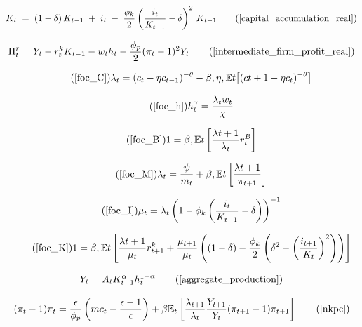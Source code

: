 \documentclass[11pt,preprint]{elsarticle}
\numberwithin{equation}{section}
\numberwithin{figure}{section}
\numberwithin{table}{section}
\begin{document}
\begin{equation}
K_t
\;=\;
(1 - \delta)\,K_{t-1}
\;+\; i_t
\;-\;\frac{\phi_k}{2}
\left(\frac{i_t}{K_{t-1}} - \delta\right)^{2}
\,K_{t-1}
\tag{\ref{capital_accumulation_real}}
\end{equation}

\begin{equation}
\Pi^r_t = Y_t - r^k_t K_{t-1} - w_t h_t - \dfrac{\phi_p}{2} (\pi_t - 1)^2 Y_t
\tag{\ref{intermediate_firm_profit_real}}
\end{equation}

\begin{equation}\tag{\ref{foc_C}}
\lambda_t = (c_t-\eta c_{t-1})^{-\theta} - \beta,\eta,\mathbb{E}t\bigl[(c{t+1}-\eta c_t)^{-\theta}\bigr]
\end{equation}

\begin{equation}\tag{\ref{foc_h}}
h_t^{\gamma} = \frac{\lambda_t w_t}{\chi}
\end{equation}

\begin{equation}\tag{\ref{foc_B}}
1 = \beta , \mathbb{E}t \left[ \frac{\lambda{t+1}}{\lambda_t} r^B_t \right]
\end{equation}

\begin{equation}\tag{\ref{foc_M}}
\lambda_t = \dfrac{\psi}{m_t} + \beta , \mathbb{E}t \left[ \dfrac{\lambda{t+1}}{\pi_{t+1}} \right]
\end{equation}

\begin{equation}\tag{\ref{foc_I}}
\mu_t = \lambda_t \left( 1 - \phi_k \left( \frac{i_t}{K_{t-1}} - \delta \right) \right)^{-1}
\end{equation}

\begin{equation}\tag{\ref{foc_K}}
1 = \beta , \mathbb{E}t \left[ \frac{\lambda{t+1}}{\mu_t} r^k_{t+1} + \frac{\mu_{t+1}}{\mu_t} \left( (1-\delta) - \frac{\phi_k}{2} \left( \delta^2 - \left( \frac{i_{t+1}}{K_t} \right)^2 \right) \right) \right]
\end{equation}

\begin{equation}
Y_t = A_t K_{t-1}^{\alpha} h_t^{1-\alpha}  \tag{\ref{aggregate_production}}
\end{equation}

\begin{equation}
(\pi_t - 1)\pi_t = \frac{\epsilon}{\phi_p} \left( mc_t - \frac{\epsilon-1}{\epsilon} \right) + \beta \mathbb{E}_t \left[ \frac{\lambda_{t+1}}{\lambda_t} \frac{Y_{t+1}}{Y_t} (\pi_{t+1} - 1)\pi_{t+1} \right]  \tag{\ref{nkpc}}
\end{equation}
\end{document}
